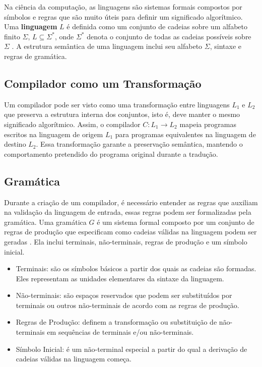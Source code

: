 \documentclass[english, 
               brazil, 
               bsc] %
               {dcomp-abntex2}
\begin{document}
Na ciência da computação, as linguagens são sistemas formais compostos por símbolos e regras que são muito úteis para definir um significado algorítmico. Uma \textbf{linguagem} $L$ é definida como um conjunto de cadeias sobre um alfabeto finito $ \Sigma $, $ L \subseteq \Sigma^* $, onde  $ \Sigma^* $ denota o conjunto de todas as cadeias possíveis sobre $ \Sigma $ \cite{language_theory}. A estrutura semântica de uma linguagem inclui seu alfabeto $ \Sigma $, sintaxe e regras de gramática.

\subsection{Compilador como um Transformação}

Um compilador pode ser visto como uma transformação entre linguagens $ L_1 $ e $ L_2 $ que preserva a estrutura interna dos conjuntos, isto é, deve manter o mesmo significado algorítmico. Assim, o compilador $ C: L_1 \rightarrow L_2 $ mapeia programas escritos na linguagem de origem $ L_1 $ para programas equivalentes na linguagem de destino $ L_2 $. Essa transformação garante a preservação semântica, mantendo o comportamento pretendido do programa original durante a tradução.


\subsection{Gramática} \label{gramatica}

Durante a criação de um compilador, é necessário entender as regras que auxiliam na validação da linguagem de entrada, essas regras podem ser formalizadas pela gramática. Uma gramática $G$ é um sistema formal composto por um conjunto de regras de produção que especificam como cadeias válidas na linguagem podem ser geradas \cite{language_theory}. Ela inclui terminais, não-terminais, regras de produção e um símbolo inicial.

\begin{itemize}
  \item Terminais: são os símbolos básicos a partir dos quais as cadeias são formadas. Eles representam as unidades elementares da sintaxe da linguagem.
  \item Não-terminais: são espaços reservados que podem ser substituídos por terminais ou outros não-terminais de acordo com as regras de produção.

  \item Regras de Produção: definem a transformação ou substituição de não-terminais em sequências de terminais e/ou não-terminais.

  \item Símbolo Inicial: é um não-terminal especial a partir do qual a derivação de cadeias válidas na linguagem começa.
\end{itemize}
\end{document}

